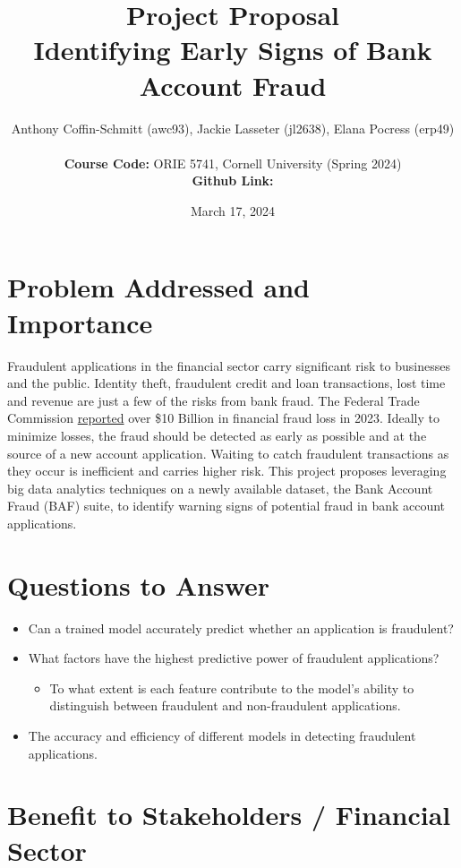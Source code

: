 \documentclass{article}
\title{Project Proposal \\
Identifying Early Signs of Bank Account Fraud}
\author{Anthony Coffin-Schmitt (awc93), Jackie Lasseter (jl2638), Elana Pocress (erp49) \\ \\
\textbf{Course Code:} ORIE 5741, Cornell University (Spring 2024) \\ 
\textbf{Github Link:} \href{https://github.com/AnthonyCS/orie_5741_project}{\text{https://github.com/AnthonyCS/orie\_5741\_project}} }
\date{March 17, 2024}
\begin{document}
\maketitle

\section*{Problem Addressed and Importance}

Fraudulent applications in the financial sector carry significant risk to businesses and the public. Identity theft, fraudulent credit and loan transactions, lost time and revenue are just a few of the risks from bank fraud. The Federal Trade Commission \href{https://www.ftc.gov/news-events/news/press-releases/2024/02/nationwide-fraud-losses-top-10-billion-2023-ftc-steps-efforts-protect-public}{reported} over \$10 Billion in financial fraud loss in 2023. Ideally to minimize losses, the fraud should be detected as early as possible and at the source of a new account application. Waiting to catch fraudulent transactions as they occur is inefficient and carries higher risk. This project proposes leveraging big data analytics techniques on a newly available dataset, the Bank Account Fraud (BAF) suite, to identify warning signs of potential fraud in bank account applications.

\section*{Questions to Answer}
\begin{itemize}
    \item Can a trained model accurately predict whether an application is fraudulent?
    \item What factors have the highest predictive power of fraudulent applications? 
    \begin{itemize}
        \item To what extent is each feature contribute to the model’s ability to distinguish between fraudulent and non-fraudulent applications.
    \end{itemize}
    \item The accuracy and efficiency of different models in detecting fraudulent applications.
\end{itemize}

\section*{Benefit to Stakeholders / Financial Sector}
\end{document}
